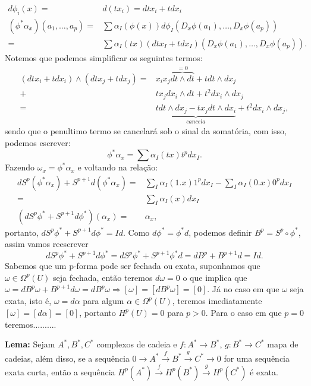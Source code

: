 \documentclass{article}
\begin{document}
	$$
	\begin{aligned}
	d\phi_{i}(x) =& d(tx_{i}) = dtx_{i} + tdx_{i} 
	\\
	(\phi^{*}\alpha_{x})(a_{1},\dots,a_{p}) =& \sum \alpha_{I}(\phi(x))d\phi_{I}(D_{x}\phi(a_{1}),\dots, D_{x}\phi(a_{p}))
	\\
	=& \sum \alpha_{I}(tx)(dtx_{I} + tdx_{I})(D_{x}\phi(a_{1}),\dots, D_{x}\phi(a_{p})).
	\end{aligned}
	$$
	Notemos que podemos simplificar os seguintes termos: 
	$$
	\begin{aligned}
	(dtx_{i} + tdx_{i}) \wedge (dtx_{j} + tdx_{j}) =& x_{i}x_{j} \overbrace{ dt \wedge dt}^{=0} + tdt \wedge dx_{j} 
	\\
	+& tx_{j}dx_{i}\wedge dt + t^{2} dx_{i} \wedge dx_{j}
	\\
	=& \underbrace{ tdt \wedge dx_{j} - tx_{j} dt \wedge dx_{i} }_{cancela}+ t^{2} dx_{i} \wedge dx_{j},
	\end{aligned}
	$$
	sendo que o penultimo termo se cancelará sob o sinal da somatória, com isso, podemos escrever: 
	$$
	\phi^{*}\alpha_{x} = \sum \alpha_{I}(tx) t^{p} dx_{I}.
	$$
	Fazendo $\omega_{x} = \phi^{*}\alpha_{x}$ e voltando na relação:
	$$
	\begin{aligned}
   	dS^{p}(\phi^{*}\alpha_{x}) + S^{p+1}d(\phi^{*}\alpha_{x}) 
	 =& \sum_{I} \alpha_{I}(1.x) 1^{p} dx_{I} - \sum_{I} \alpha_{I}(0.x) 0^{p} dx_{I}
	 \\
	 =& \sum_{I} \alpha_{I}(x) dx_{I}
	 \\
	 (dS^{p}\phi^{*} + S^{p+1}d\phi^{*})(\alpha_{x}) =& \alpha_{x},
	\end{aligned}$$
	portanto, $dS^{p}\phi^{*} + S^{p+1}d\phi^{*} = Id$. Como $d\phi^{*} = \phi^{*}d$, podemos definir $B^{p} = S^{p}\circ\phi^{*}$, assim vamos reescrever
	$$
	dS^{p}\phi^{*} + S^{p+1}d\phi^{*} = dS^{p}\phi^{*} + S^{p+1}\phi^{*}d = dB^{p} + B^{p+1}d = Id.
	$$
	Sabemos que um p-forma pode ser fechada ou exata, suponhamos que $\omega \in \Omega^{p}(U)$ seja fechada, então teremos $d\omega = 0$ o que implica que $\omega = dB^{p}\omega + B^{p+1}d\omega = dB^{p}\omega \Rightarrow [\omega] = [dB^{p}\omega] = [0]$. Já no caso em que $\omega$ seja exata, isto é, $\omega = d\alpha$ para algum $\alpha \in \Omega^{p}(U)$, teremos imediatamente $[\omega] =[d\alpha] = [0]$, portanto $H^{p}(U) = 0$ para $p>0$. Para o caso em que $p=0$ teremos..........

	\textbf{Lema:} Sejam $A^{*}, B^{*}, C^{*}$ complexos de cadeia e $f:A^{*} \to B^{*}$, $g:B^{*} \to C^{*}$ mapa de cadeias, além disso, se a sequência $0 \to A^{*} \xrightarrow{f} B^{*} \xrightarrow{g} C^{*} \to 0$ for uma sequência exata curta, então a sequência $H^{p}(A^{*}) \xrightarrow{f} H^{p}(B^{*}) \xrightarrow{g} H^{p}(C^{*}) $ é exata.
	
\end{document}
